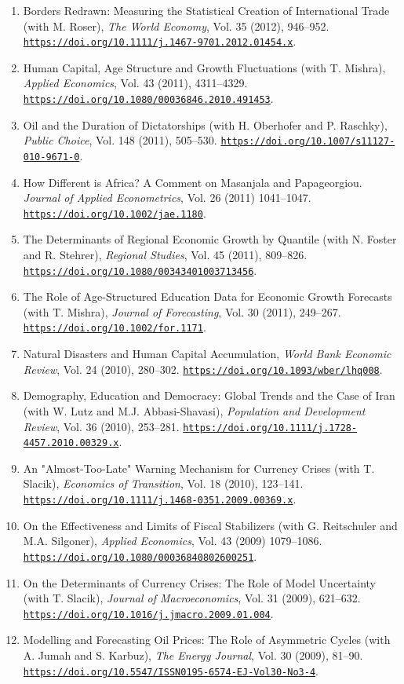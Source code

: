 \documentclass[10pt]{res} %
\newcommand{\doiurl}[1]{\href{https://doi.org/#1}{\nolinkurl{https://doi.org/#1}}}
\begin{document}
\begin{resume}
\begin{enumerate}
\item Borders Redrawn: Measuring the Statistical Creation of International Trade (with M. Roser),\textit{ The World Economy}, Vol. 35 (2012), 946--952. \doiurl{10.1111/j.1467-9701.2012.01454.x}.
\item Human Capital, Age Structure and Growth Fluctuations (with T. Mishra), \textit{Applied Economics}, Vol. 43 (2011), 4311--4329. \doiurl{10.1080/00036846.2010.491453}.
\item Oil and the Duration of Dictatorships (with H. Oberhofer and P. Raschky),\textit{ Public Choice}, Vol. 148 (2011), 505--530. \doiurl{10.1007/s11127-010-9671-0}.
\item How Different is Africa? A Comment on Masanjala and Papageorgiou. \textit{Journal of Applied Econometrics}, Vol. 26 (2011) 1041--1047. \doiurl{10.1002/jae.1180}.
\item The Determinants of Regional Economic Growth by Quantile (with N. Foster and R. Stehrer), \textit{Regional Studies}, Vol. 45 (2011), 809--826. \doiurl{10.1080/00343401003713456}.
\item The Role of Age-Structured Education Data for Economic Growth Forecasts (with T. Mishra), \textit{Journal of Forecasting}, Vol. 30 (2011), 249--267. \doiurl{10.1002/for.1171}.
\item Natural Disasters and Human Capital Accumulation, \textit{World Bank Economic Review}, Vol. 24 (2010), 280--302. \doiurl{10.1093/wber/lhq008}.
\item Demography, Education and Democracy: Global Trends and the Case of Iran (with W. Lutz and M.J. Abbasi-Shavasi), \textit{Population and Development Review}, Vol. 36 (2010), 253--281. \doiurl{10.1111/j.1728-4457.2010.00329.x}.
\item An "Almost-Too-Late" Warning Mechanism for Currency Crises (with T. Slacik), \textit{Economics of Transition}, Vol. 18 (2010), 123--141. \doiurl{10.1111/j.1468-0351.2009.00369.x}.
\item On the Effectiveness and Limits of Fiscal Stabilizers (with G. Reitschuler and M.A. Silgoner), \textit{Applied Economics}, Vol. 43 (2009) 1079--1086. \doiurl{10.1080/00036840802600251}.
\item On the Determinants of Currency Crises: The Role of Model Uncertainty (with T. Slacik), \textit{Journal of Macroeconomics}, Vol. 31 (2009), 621--632. \doiurl{10.1016/j.jmacro.2009.01.004}.
\item Modelling and Forecasting Oil Prices: The Role of Asymmetric Cycles (with A. Jumah and S. Karbuz), \textit{The Energy Journal}, Vol. 30 (2009), 81--90. \doiurl{10.5547/ISSN0195-6574-EJ-Vol30-No3-4}.

\end{enumerate}
\end{resume}
\end{document}

